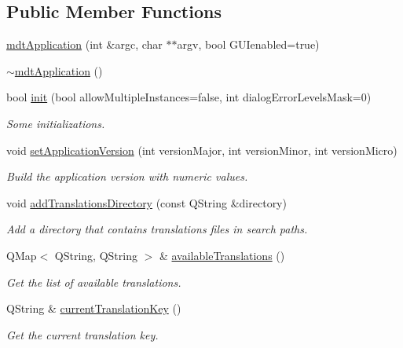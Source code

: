 \subsection*{Public Member Functions}
\begin{DoxyCompactItemize}
\item 
\hyperlink{classmdt_application_ab6268414770ee9239c83677c15a67f75}{mdt\-Application} (int \&argc, char $\ast$$\ast$argv, bool G\-U\-Ienabled=true)
\item 
\hyperlink{classmdt_application_a583a180d10eb6b1115330ef256431164}{$\sim$mdt\-Application} ()
\item 
bool \hyperlink{classmdt_application_a3b8798416e730f85e419566442adb77b}{init} (bool allow\-Multiple\-Instances=false, int dialog\-Error\-Levels\-Mask=0)
\begin{DoxyCompactList}\small\item\em Some initializations. \end{DoxyCompactList}\item 
void \hyperlink{classmdt_application_a79dbb5f3d889d7cd9b8909a4eb8bcce1}{set\-Application\-Version} (int version\-Major, int version\-Minor, int version\-Micro)
\begin{DoxyCompactList}\small\item\em Build the application version with numeric values. \end{DoxyCompactList}\item 
void \hyperlink{classmdt_application_ab5279a8c25923ab4c570670b8a41d599}{add\-Translations\-Directory} (const Q\-String \&directory)
\begin{DoxyCompactList}\small\item\em Add a directory that contains translations files in search paths. \end{DoxyCompactList}\item 
Q\-Map$<$ Q\-String, Q\-String $>$ \& \hyperlink{classmdt_application_a9ce5b5c3ca36a76ad0acc3913ce8f89a}{available\-Translations} ()
\begin{DoxyCompactList}\small\item\em Get the list of available translations. \end{DoxyCompactList}\item 
Q\-String \& \hyperlink{classmdt_application_a531e64266be58b3a10608b21ae6afedb}{current\-Translation\-Key} ()
\begin{DoxyCompactList}\small\item\em Get the current translation key. \end{DoxyCompactList}\item 
$$
\end{DoxyCompactItemize}
